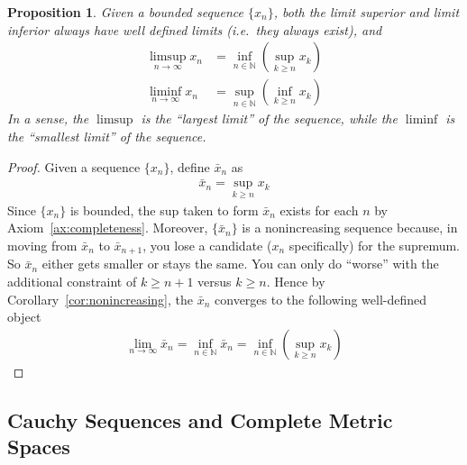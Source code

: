 \documentclass[12pt]{article}
\numberwithin{equation}{section} %
\theoremstyle{plain}
\newtheorem{prop}[thm]{Proposition}
\theoremstyle{definition}
\theoremstyle{remark}
\begin{document}
\begin{prop}
Given a bounded sequence $\{x_n\}$,
both the limit superior and limit inferior always have well defined
limits (i.e.\ they always exist), and
\begin{align*}
  \limsup_{n\rightarrow \infty} x_n
  &= \inf_{n\in \mathbb{N}} \left(\sup_{k\geq n} x_k\right)\\
  \liminf_{n\rightarrow \infty} x_n
  &= \sup_{n\in \mathbb{N}} \left(\inf_{k\geq n} x_k\right)
\end{align*}
In a sense, the $\limsup$ is the ``largest limit'' of the sequence,
while the $\liminf$ is the ``smallest limit'' of the sequence.
\end{prop}
\begin{proof}
Given a sequence $\{x_n\}$, define $\bar{x}_n$ as
\begin{align*}
  \bar{x}_n = \sup_{k\geq n} x_k
\end{align*}
Since $\{x_n\}$ is bounded, the sup taken to form $\bar{x}_n$ exists for
each $n$ by Axiom~\ref{ax:completeness}. Moreover, $\{\bar{x}_n\}$ is a
nonincreasing sequence because, in moving from $\bar{x}_n$ to
$\bar{x}_{n+1}$, you lose a candidate ($x_n$ specifically) for the
supremum. So $\bar{x}_n$ either gets smaller or stays the same. You can
only do ``worse'' with the additional constraint of $k\geq n+1$ versus
$k\geq n$. Hence by Corollary~\ref{cor:nonincreasing}, the $\bar{x}_n$
converges to the following well-defined object
\begin{align*}
  \lim_{n\rightarrow \infty}\bar{x}_n
  = \inf_{n\in \mathbb{N}} \bar{x}_n
  = \inf_{n\in \mathbb{N}} \left( \sup_{k\geq n} x_k\right)
\end{align*}
\end{proof}


\subsection{Cauchy Sequences and Complete Metric Spaces}
\end{document}
